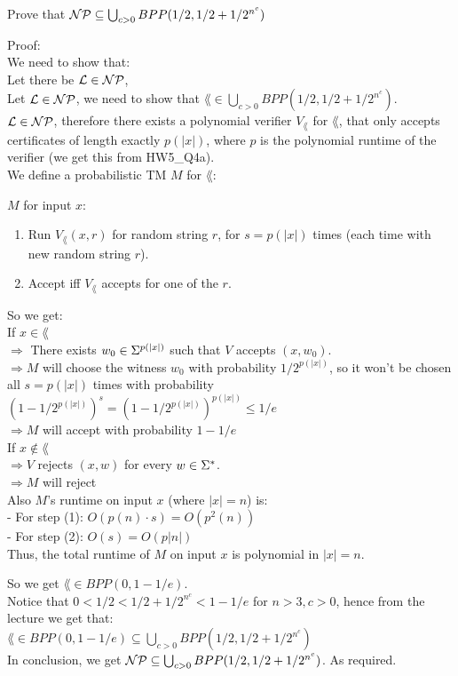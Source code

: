 Prove that $\mathcal{N}\mathcal{P} \subseteq \bigcup_{c>0} BPP(1/2, 1/2 + 1/2^{n^c})$

Proof: \\
We need to show that: \\
Let there be $\mathcal{L} \in \mathcal{N}\mathcal{P}$,  \\

Let $\mathcal{L} \in \mathcal{N}\mathcal{P}$, we need to show that $\lang \in \bigcup_{c>0} BPP(1/2, 1/2 + 1/2^{n^c})$. \\
$\mathcal{L} \in \mathcal{N}\mathcal{P}$, therefore there exists a polynomial verifier $V_\lang$ for $\lang$, that only accepts
certificates of length exactly $p(|x|)$, where $p$ is the polynomial runtime of the verifier
(we get this from HW5\_Q4a). \\
We define a probabilistic TM $M$ for $\lang$:

$M$ for input $x$:
\begin{enumerate}[1., itemsep=5pt]

    \item Run $V_\lang(x, r)$ for random string $r$, for $s=p(|x|)$ times (each time with new random string $r$).

    \item Accept iff $V_\lang$ accepts for one of the $r$.

\end{enumerate}

So we get: \\
If $x \in \lang$ \\
$\Rightarrow $ There exists $w_0 \in \Sigma^{p(|x|)}$ such that $V$ accepts $(x, w_0)$. \\
$\Rightarrow M$ will choose the witness $w_0$ with probability $1/2^{p(|x|)}$,
so it won't be chosen all $s=p(|x|)$ times with probability $(1 - 1/2^{p(|x|)})^s = (1 - 1/2^{p(|x|)})^{p(|x|)} \leq 1/e$ \\
$\Rightarrow M$ will accept with probability $1 - 1/e$ \\

If $x \notin \lang$ \\
$\Rightarrow V$ rejects $(x, w)$ for every $w \in \Sigma^*$. \\
$\Rightarrow M$ will reject\\

Also $M$'s runtime on input $x$ (where $|x|=n$) is: \\
- For step (1): $O(p(n) \cdot s) = O(p^2(n)) $  \\
- For step (2): $O(s) = O(p|n|)$ \\
Thus, the total runtime of $M$ on input $x$ is polynomial in $|x|=n$.

So we get $\lang \in BPP(0, 1 - 1/e)$. \\
Notice that $0 < 1/2 < 1/2 + 1/2^{n^c} < 1 - 1/e$ for $n > 3, c > 0$, hence from the lecture we get that: \\
$\lang \in BPP(0, 1 - 1/e) \subseteq \bigcup_{c>0} BPP(1/2, 1/2 + 1/2^{n^c})$ \\
In conclusion, we get $\mathcal{N}\mathcal{P} \subseteq \bigcup_{c>0} BPP(1/2, 1/2 + 1/2^{n^c})$. As required.


